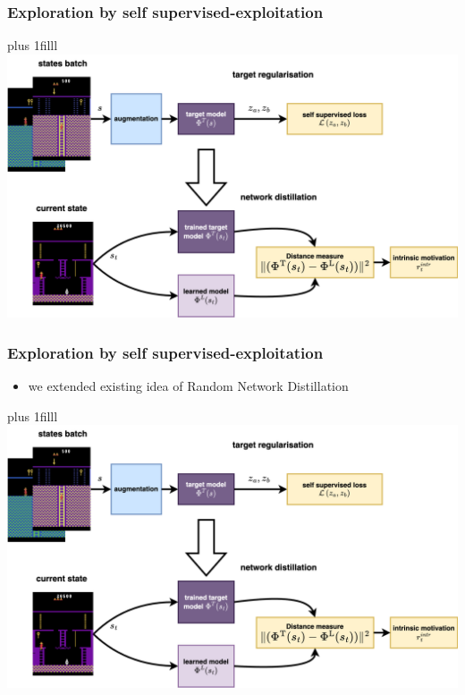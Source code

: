 \documentclass{beamer}
\begin{document}
\begin{frame}
  \frametitle{Exploration by self supervised-exploitation}

  \vskip 0pt plus 1filll
    \centering
    \includegraphics[scale=0.4]{../diagrams/cnd/cnd-cnd.png}

\end{frame}

\begin{frame}
  \frametitle{Exploration by self supervised-exploitation}

  \begin{itemize}
    \item we extended existing idea of Random Network Distillation
  \end{itemize}

  \vskip 0pt plus 1filll
    \centering
    \includegraphics[scale=0.4]{../diagrams/cnd/cnd-cnd.png}

\end{frame}
\end{document}
